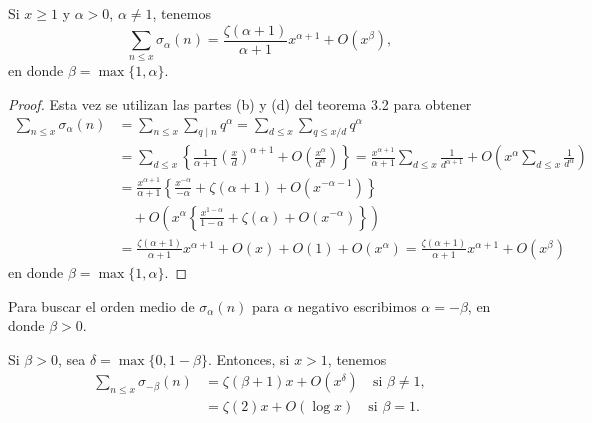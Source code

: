 \documentclass[12pt,a4paper]{book}
\begin{document}
    \begin{teorema}
        Si $x\geq1$ y $\alpha>0$, $\alpha\neq1$, tenemos
        \begin{equation*}
            \sum_{n\leq x}\sigma_\alpha(n)=\frac{\zeta(\alpha+1)}{\alpha+1}x^{\alpha+1}+O(x^\beta),
        \end{equation*}
        en donde $\beta=\max\{1,\alpha\}$.
    \end{teorema}

    \begin{proof}
        Esta vez se utilizan las partes (b) y (d) del teorema 3.2 para obtener
        \begin{align*}
            \sum_{n\leq x}\sigma_\alpha(n)&=\sum_{n\leq x}\sum_{q\mid n}q^\alpha
            =\sum_{d\leq x}\sum_{q\leq x/d}q^\alpha\\
            &=\sum_{d\leq x}\left\{\frac{1}{\alpha+1}\left(\frac{x}{d}\right)^{\alpha+1}
            +O\left(\frac{x^\alpha}{d^\alpha}\right)\right\}
            =\frac{x^{\alpha+1}}{\alpha+1}\sum_{d\leq x}\frac{1}{d^{\alpha+1}}
            +O\left(x^\alpha\sum_{d\leq x}\frac{1}{d^\alpha}\right)\\
            &=\frac{x^{\alpha+1}}{\alpha+1}\left\{\frac{x^{-\alpha}}{-\alpha}+\zeta(\alpha+1)
            +O(x^{-\alpha-1})\right\}\\
            &\quad+O\left(x^\alpha\left\{\frac{x^{1-\alpha}}{1-\alpha}+\zeta(\alpha)+O(x^{-\alpha})\right\}\right)\\
            &=\frac{\zeta(\alpha+1)}{\alpha+1}x^{\alpha+1}+O(x)+O(1)+O(x^\alpha)
            =\frac{\zeta(\alpha+1)}{\alpha+1}x^{\alpha+1}+O(x^\beta)
        \end{align*}
        en donde $\beta=\max\{1,\alpha\}$.
    \end{proof}

    Para buscar el orden medio de $\sigma_\alpha(n)$ para $\alpha$ negativo escribimos
    $\alpha=-\beta$, en donde $\beta>0$.

    \begin{teorema}
        Si $\beta>0$, sea $\delta=\max\{0,1-\beta\}$. Entonces, si $x>1$, tenemos
        \begin{align*}
            \sum_{n\leq x}\sigma_{-\beta}(n)&=\zeta(\beta+1)x+O(x^\delta)\quad\text{si } \beta\neq1,\\
            &=\zeta(2)x+O(\log x)\quad\text{si } \beta=1.
        \end{align*}
    \end{teorema}
\end{document}
